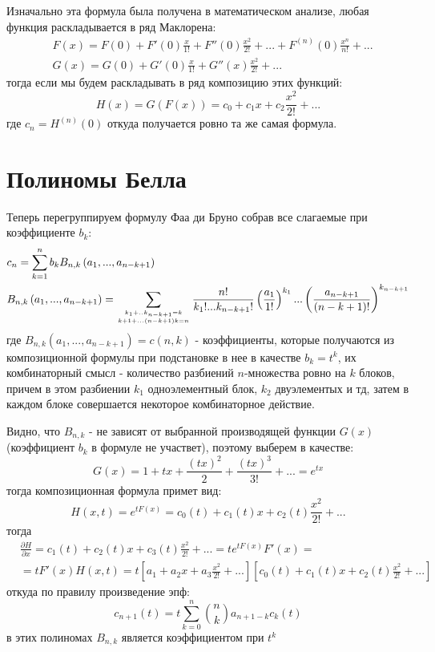 Изначально эта формула была получена в математическом анализе, любая функция раскладывается в ряд Маклорена:
\[
	\begin{split}
		& F\left(x\right) = F\left(0\right) + F'\left(0\right) \frac{x}{1!} + F''\left(0\right) \frac{x^2}{2!} + ... + F^{\left(n\right)}\left(0\right)\frac{x^n}{n!} + ...\\
		& G\left(x\right) = G\left(0\right) + G'\left(0\right) \frac{x}{1!} + G''\left(x\right) \frac{x^2}{2!} + ...
	\end{split}
\]
тогда если мы будем раскладывать в ряд композицию этих функций:
\[
	H\left(x\right) = G\left(F\left(x\right)\right) = c_0 + c_1 x + c_2 \frac{x^2}{2!} + ...
\]
где $c_n = H^{\left(n\right)}\left(0\right)$ откуда получается ровно та же самая формула.

\section{Полиномы Белла}

Теперь перегруппируем формулу Фаа ди Бруно собрав все слагаемые при коэффициенте $b_k$:
\[
	\begin{split}
		& c_n = \sum_{k=1}^n b_k B_{n,k}\left(a_1, ..., a_{n-k+1}\right) \\
		& B_{n,k}\left(a_1,...,a_{n-k+1}\right) = \sum_{{k_1+..k_{n-k+1} = k}\atop{k+1 + ... \left(n-k+1\right)k = n}} \frac{n!}{k_1!...k_{n-k+1}!}\left(\frac{a_1}{1!}\right)^{k_1}...\left(\frac{a_{n-k+1}}{\left(n-k+1\right)!}\right)^{k_{n-k+1}}
	\end{split}
\]
где $B_{n,k}\left(a_1,...,a_{n-k+1}\right) = c\left(n,k\right)$ - коэффициенты, которые получаются из композиционной формулы при подстановке в нее в качестве $b_k = t^k$, их комбинаторный смысл - количество разбиений $n$-множества ровно на $k$ блоков, причем в этом разбиении $k_1$ одноэлементный блок, $k_2$ двуэлементых и тд, затем в каждом блоке совершается некоторое комбинаторное действие.

Видно, что $B_{n,k}$ - не зависят от выбранной производящей функции $G\left(x\right)$ (коэффициент $b_k$ в формуле не участвет), поэтому выберем в качестве:
\[
	G\left(x\right) = 1 + tx + \frac{\left(tx\right)^2}{2} + \frac{\left(tx\right)^3}{3!} + ... = e^{tx}
\]
тогда композиционная формула примет вид:
\[
	H\left(x,t\right) = e^{tF\left(x\right)} = c_0\left(t\right) + c_1\left(t\right)x + c_2\left(t\right)\frac{x^2}{2!} + ...
\]
тогда
\[
	\begin{split}
		& \frac{\partial H}{\partial x} = c_1\left(t\right) + c_2\left(t\right)x + c_3\left(t\right)\frac{x^2}{2!} + ... = te^{tF\left(x\right)}F'\left(x\right) = \\
		& = t F'\left(x\right) H\left(x,t\right) = t\left[a_1 + a_2x + a_3\frac{x^2}{2!} + ... \right]\left[c_0\left(t\right) + c_1\left(t\right)x + c_2\left(t\right)\frac{x^2}{2!} + ...\right]
	\end{split}
\]
откуда по правилу произведение эпф:
\begin{equation}
	c_{n+1}\left(t\right) = t\sum_{k=0}^n \binom{n}{k} a_{n+1-k}c_k\left(t\right)
\end{equation}
в этих полиномах $B_{n,k}$ является коэффициентом при $t^k$

